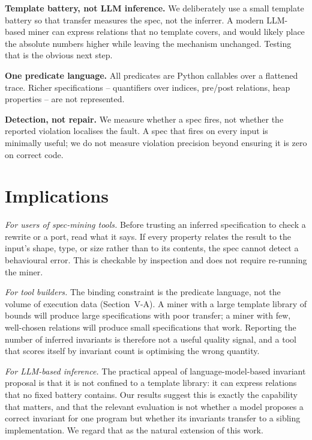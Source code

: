 \documentclass[conference]{IEEEtran}
\begin{document}
\textbf{Template battery, not LLM inference.} We deliberately use a small template battery
so that transfer measures the spec, not the inferrer. A modern LLM-based miner can express
relations that no template covers, and would likely place the absolute numbers higher while
leaving the mechanism unchanged. Testing that is the obvious next step.

\textbf{One predicate language.} All predicates are Python callables over a flattened
trace. Richer specifications -- quantifiers over indices, pre/post relations, heap
properties -- are not represented.

\textbf{Detection, not repair.} We measure whether a spec fires, not whether the reported
violation localises the fault. A spec that fires on every input is minimally useful; we do
not measure violation precision beyond ensuring it is zero on correct code.

\section{Implications}

\textit{For users of spec-mining tools.} Before trusting an inferred specification to
check a rewrite or a port, read what it says. If every property relates the result to the
input's shape, type, or size rather than to its contents, the spec cannot detect a
behavioural error. This is checkable by inspection and does not require re-running the
miner.

\textit{For tool builders.} The binding constraint is the predicate language, not the
volume of execution data (Section~V-A). A miner with a large template library of bounds
will produce large specifications with poor transfer; a miner with few, well-chosen
relations will produce small specifications that work. Reporting the number of inferred
invariants is therefore not a useful quality signal, and a tool that scores itself by
invariant count is optimising the wrong quantity.

\textit{For LLM-based inference.} The practical appeal of language-model-based invariant
proposal is that it is not confined to a template library: it can express relations that no
fixed battery contains. Our results suggest this is exactly the capability that matters,
and that the relevant evaluation is not whether a model proposes a correct invariant for
one program but whether its invariants transfer to a sibling implementation. We regard that
as the natural extension of this work.
\end{document}
